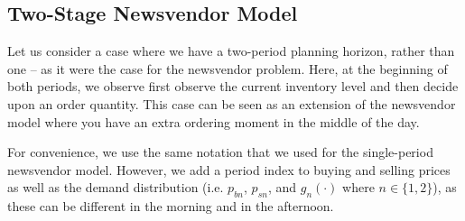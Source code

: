 \subsection{Two-Stage Newsvendor Model}

Let us consider a case where we have a two-period planning horizon, rather than one -- as it were the case for the newsvendor problem. Here, at the beginning of both periods, we observe first observe the current inventory level and then decide upon an order quantity. This case can be seen as an extension of the newsvendor model where you have an extra ordering moment in the middle of the day. 

For convenience, we use the same notation that we used for the single-period newsvendor model. However, we add a period index to buying and selling prices as well as the demand distribution (i.e. $p_{bn}$, $p_{sn}$, and $g_n(\cdot)$ where $n\in\{1,2\}$), as these can be different in the morning and in the afternoon.

